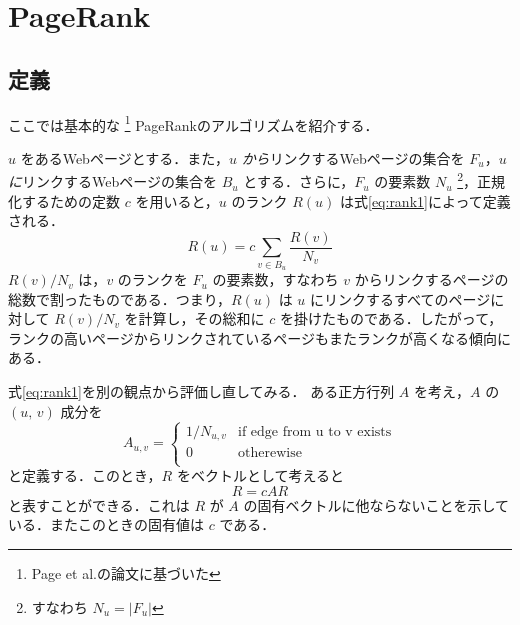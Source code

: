 \documentclass[a4j, dvipdfmx, twocolumn]{jsarticle}
\begin{document}
\section{PageRank}
\subsection{定義}
\label{sec:pagerank-definition}
ここでは基本的な
\footnote{Page et al.\cite{ilprints422}の論文に基づいた}
PageRankのアルゴリズムを紹介する．

$u$ をあるWebページとする．また，$u$ \emph{から}リンクするWebページの集合を $F_u$，$u$ \emph{に}リンクするWebページの集合を $B_u$ とする．さらに，$F_u$ の要素数 $N_u$
\footnote{すなわち $N_u = |F_u|$}，正規化するための定数 $c$ を用いると，$u$ のランク $R(u)$ は式\eqref{eq:rank1}によって定義される．
\begin{equation}
  \label{eq:rank1}
  R(u) = c  \sum_{v \in B_u} \frac{R(v)}{N_v}
\end{equation}
$R(v) / N_v$ は，$v$ のランクを $F_u$ の要素数，すなわち $v$ からリンクするページの総数で割ったものである．つまり，$R(u)$ は $u$ にリンクするすべてのページに対して $R(v) / N_v$ を計算し，その総和に $c$ を掛けたものである．したがって，ランクの高いページからリンクされているページもまたランクが高くなる傾向にある．

式\eqref{eq:rank1}を別の観点から評価し直してみる．
ある正方行列 $A$ を考え，$A$ の $(u,\,v)$ 成分を
\begin{equation}
  \label{eq:Auv}
  A_{u,v} = \begin{cases}
    1/N_{u,v} & \text{if edge from u to v exists} \\
    0 & \text{otherewise} \\
  \end{cases}
\end{equation}
と定義する．このとき，$R$ をベクトルとして考えると
\begin{equation}
  \label{eq:R}
  R = cAR
\end{equation}
と表すことができる．これは $R$ が $A$ の固有ベクトルに他ならないことを示している．またこのときの固有値は $c$ である．
\end{document}
